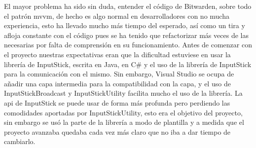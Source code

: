 El mayor problema ha sido sin duda, entender el código de Bitwarden, sobre todo el patrón \gls{mvvm}, de hecho es algo normal en desarrolladores con no mucha experiencia\cite{García2023intro}, esto ha llevado mucho más tiempo del esperado, así como un tira y afloja constante con el código pues se ha tenido que refactorizar más veces de las necesarias por falta de comprensión en su funcionamiento. Antes de comenzar con el proyecto nuestras expectativas eran que la dificultad estuviese en usar la librería de InputStick, escrita en Java, en C\# y el uso de la librería de InputStick para la comunicación con el mismo. Sin embargo, Visual Studio se ocupa de añadir una capa intermedia para la compatibilidad con la capa, y el uso de InputStickBroadcast y InputStickUtility facilita mucho el uso de la librería. La \gls{api} de InputStick se puede usar de forma más profunda pero perdiendo las comodidades aportadas por InputStickUtility, esto era el objetivo del proyecto, sin embargo se usó la parte  de la librería a modo de plantilla y a medida que el proyecto avanzaba quedaba cada vez más claro que no iba a dar tiempo de cambiarlo.